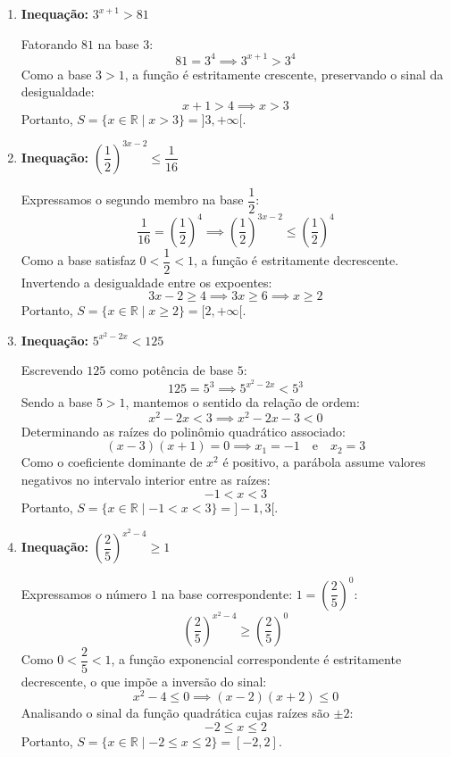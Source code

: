 \documentclass[12pt,a4paper]{report}
\begin{document}
	\begin{enumerate}[label=\textbf{\arabic*.}]
		
		\item \textbf{Inequação:} $3^{x+1} > 81$
		
		Fatorando $81$ na base $3$:
		\[
		81 = 3^4 \implies 3^{x+1} > 3^4
		\]
		Como a base $3 > 1$, a função é estritamente crescente, preservando o sinal da desigualdade:
		\[
		x + 1 > 4 \implies x > 3
		\]
		Portanto, $S = \{x \in \mathbb{R} \mid x > 3\} ={]3, +\infty[}$.
		
		\vspace{0.4cm}
		
		\item \textbf{Inequação:} $\left( \dfrac{1}{2} \right)^{3x-2} \leqslant \dfrac{1}{16}$
		
		Expressamos o segundo membro na base $\dfrac{1}{2}$:
		\[
		\frac{1}{16} = \left(\frac{1}{2}\right)^4 \implies \left(\frac{1}{2}\right)^{3x-2} \leqslant \left(\frac{1}{2}\right)^4
		\]
		Como a base satisfaz $0 < \dfrac{1}{2} < 1$, a função é estritamente decrescente. Invertendo a desigualdade entre os expoentes:
		\[
		3x - 2 \geqslant 4 \implies 3x \geqslant 6 \implies x \geqslant 2
		\]
		Portanto, $S = \{x \in \mathbb{R} \mid x \geqslant 2\} = [2, +\infty[$.
		
		\vspace{0.4cm}
		
		\item \textbf{Inequação:} $5^{x^2 - 2x} < 125$
		
		Escrevendo $125$ como potência de base $5$:
		\[
		125 = 5^3 \implies 5^{x^2 - 2x} < 5^3
		\]
		Sendo a base $5 > 1$, mantemos o sentido da relação de ordem:
		\[
		x^2 - 2x < 3 \implies x^2 - 2x - 3 < 0
		\]
		Determinando as raízes do polinômio quadrático associado:
		\[
		(x - 3)(x + 1) = 0 \implies x_1 = -1 \quad \text{e} \quad x_2 = 3
		\]
		Como o coeficiente dominante de $x^2$ é positivo, a parábola assume valores negativos no intervalo interior entre as raízes:
		\[
		-1 < x < 3
		\]
		Portanto, $S = \{x \in \mathbb{R} \mid -1 < x < 3\} ={]-1, 3[}$.
		
		\vspace{0.4cm}
		
		\item \textbf{Inequação:} $\left( \dfrac{2}{5} \right)^{x^2 - 4} \geqslant 1$
		
		Expressamos o número $1$ na base correspondente: $1 = \left(\dfrac{2}{5}\right)^0$:
		\[
		\left(\frac{2}{5}\right)^{x^2 - 4} \geqslant \left(\frac{2}{5}\right)^0
		\]
		Como $0 < \dfrac{2}{5} < 1$, a função exponencial correspondente é estritamente decrescente, o que impõe a inversão do sinal:
		\[
		x^2 - 4 \leqslant 0 \implies (x - 2)(x + 2) \leqslant 0
		\]
		Analisando o sinal da função quadrática cujas raízes são $\pm 2$:
		\[
		-2 \leqslant x \leqslant 2
		\]
		Portanto, $S = \{x \in \mathbb{R} \mid -2 \leqslant x \leqslant 2\} = [-2, 2]$.
		

\end{enumerate}
\end{document}
